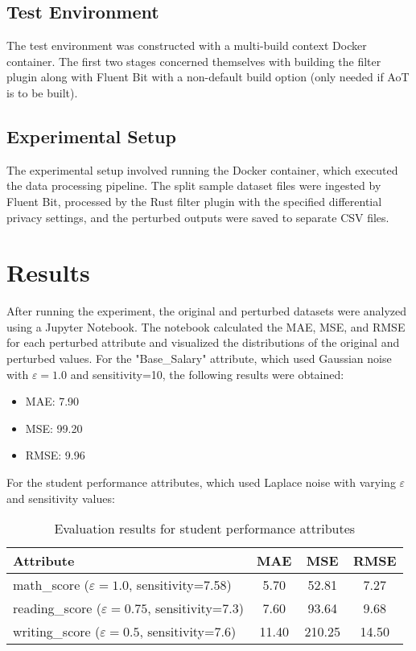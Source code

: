 \subsection{Test Environment}
The test environment was constructed with a multi-build context Docker container. The first two stages concerned themselves with building the filter plugin along with Fluent Bit with a non-default build option (only needed if AoT is to be built).

\subsection{Experimental Setup}
The experimental setup involved running the Docker container, which executed the data processing pipeline. The split sample dataset files were ingested by Fluent Bit, processed by the Rust filter plugin with the specified differential privacy settings, and the perturbed outputs were saved to separate CSV files.

\section{Results}
After running the experiment, the original and perturbed datasets were analyzed using a Jupyter Notebook. The notebook calculated the MAE, MSE, and RMSE for each perturbed attribute and visualized the distributions of the original and perturbed values.
For the "Base\_Salary" attribute, which used Gaussian noise with $\varepsilon=1.0$ and sensitivity=10, the following results were obtained:

\begin{itemize}
    \item MAE: 7.90
    \item MSE: 99.20
    \item RMSE: 9.96
\end{itemize}

For the student performance attributes, which used Laplace noise with varying $\varepsilon$ and sensitivity values:
\begin{table}[h]
    \centering
    \begin{tabular}{l|c|c|c}
    \hline
    \textbf{Attribute} & \textbf{MAE} & \textbf{MSE} & \textbf{RMSE} \\
    \hline
    math\_score ($\varepsilon=1.0$, sensitivity=7.58) & 5.70 & 52.81 & 7.27 \\
    reading\_score ($\varepsilon=0.75$, sensitivity=7.3) & 7.60 & 93.64 & 9.68 \\
    writing\_score ($\varepsilon=0.5$, sensitivity=7.6) & 11.40 & 210.25 & 14.50 \\
    \hline
    \end{tabular}
    \caption{Evaluation results for student performance attributes}
    \label{tab:student_scores}
\end{table}

